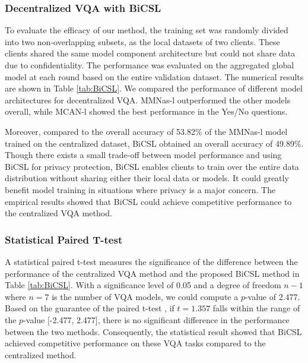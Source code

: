 \documentclass[letterpaper]{article} %
\begin{document}


\subsubsection{Decentralized VQA with BiCSL}

To evaluate the efficacy of our method, the training set was randomly divided into two non-overlapping subsets, as the local datasets of two clients. These clients shared the same model component architecture but could not share data due to confidentiality. The performance was evaluated on the aggregated global model at each round based on the entire validation dataset. The numerical results are shown in Table \ref{tab:BiCSL}. We compared the performance of different model architectures for decentralized VQA. MMNas-l outperformed the other models overall, while MCAN-l showed the best performance in the Yes/No questions.

Moreover, compared to the overall accuracy of 53.82\% of the MMNas-l model trained on the centralized dataset, BiCSL obtained an overall accuracy of 49.89\%. Though there exists a small trade-off between model performance and using BiCSL for privacy protection, BiCSL enables clients to train over the entire data distribution without sharing either their local data or models. It could greatly benefit model training in situations where privacy is a major concern. The empirical results showed that BiCSL could achieve competitive performance to the centralized VQA method. 

\subsubsection{Statistical Paired T-test}
A statistical paired t-test \cite{t-test} measures the significance of the difference between the performance of the centralized VQA method and the proposed BiCSL method in Table \ref{tab:BiCSL}. With a significance level of 0.05 and a degree of freedom $n-1$ where $n=7$ is the number of VQA models, we could compute a $p$-value of 2.477. Based on the guarantee of the paired t-test \cite{t-test}, if $t=1.357$ falls within the range of the $p$-value [-2.477, 2.477], there is no significant difference in the performance between the two methods. Consequently, the statistical result showed that BiCSL achieved competitive performance on these VQA tasks compared to the centralized method.
\end{document}
